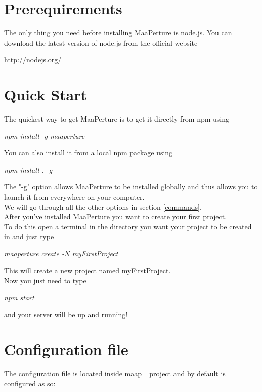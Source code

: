 \section{Prerequirements}
The only thing you need before installing MaaPerture is node.js.
You can download the latest version of node.js from the official website
\begin{center}
http://nodejs.org/
\end{center}

\section{Quick Start}
The quickest way to get MaaPerture is to get it directly from npm using
\begin{center}
\textit{npm install -g maaperture}
\end{center}

You can also install it from a local npm package using 
\begin{center}
\textit{npm install . -g}
\end{center}

The "-g" option allows MaaPerture to be installed globally and thus allows you to launch it from everywhere on your computer.\\
We will go through all the other options in section \ref{commands}.\\

After you've installed MaaPerture you want to create your first project.\\
To do this open a terminal in the directory you want your project to be created in and just type
\begin{center}
\textit{ maaperture create -N myFirstProject}
\end{center}

This will create a new project named myFirstProject.\\
Now you just need to type
\begin{center}
\textit{npm start}
\end{center}

and your server will be up and running!




\newpage
\section{Configuration file}

The configuration file is located inside   maap\_ project and by default is configured as so:\\


